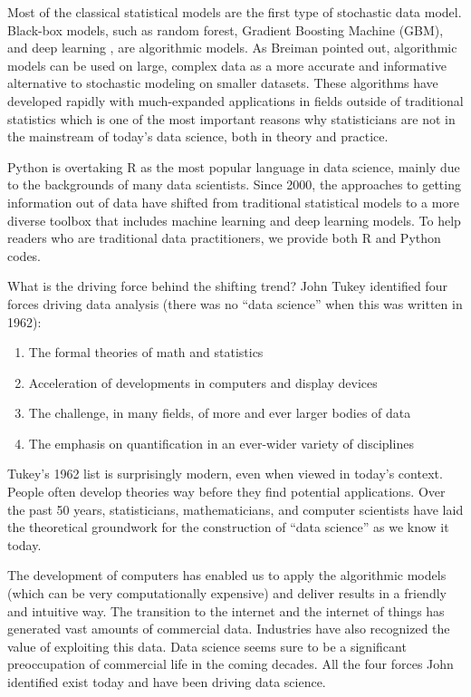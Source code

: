 \documentclass[
  12pt,
]{krantz}
\providecommand{\tightlist}{%
  \setlength{\itemsep}{0pt}\setlength{\parskip}{0pt}}
\begin{document}
Most of the classical statistical models are the first type of stochastic data model. Black-box models, such as random forest, Gradient Boosting Machine (GBM), and deep learning , are algorithmic models. As Breiman pointed out, algorithmic models can be used on large, complex data as a more accurate and informative alternative to stochastic modeling on smaller datasets. These algorithms have developed rapidly with much-expanded applications in fields outside of traditional statistics which is one of the most important reasons why statisticians are not in the mainstream of today's data science, both in theory and practice.

Python is overtaking R as the most popular language in data science, mainly due to the backgrounds of many data scientists. Since 2000, the approaches to getting information out of data have shifted from traditional statistical models to a more diverse toolbox that includes machine learning and deep learning models. To help readers who are traditional data practitioners, we provide both R and Python codes.

What is the driving force behind the shifting trend? John Tukey identified four forces driving data analysis (there was no ``data science'' when this was written in 1962):

\begin{enumerate}
\def\labelenumi{\arabic{enumi}.}
\tightlist
\item
  The formal theories of math and statistics
\item
  Acceleration of developments in computers and display devices
\item
  The challenge, in many fields, of more and ever larger bodies of data
\item
  The emphasis on quantification in an ever-wider variety of disciplines
\end{enumerate}

Tukey's 1962 list is surprisingly modern, even when viewed in today's context. People often develop theories way before they find potential applications. Over the past 50 years, statisticians, mathematicians, and computer scientists have laid the theoretical groundwork for the construction of ``data science'' as we know it today.

The development of computers has enabled us to apply the algorithmic models (which can be very computationally expensive) and deliver results in a friendly and intuitive way. The transition to the internet and the internet of things has generated vast amounts of commercial data. Industries have also recognized the value of exploiting this data. Data science seems sure to be a significant preoccupation of commercial life in the coming decades. All the four forces John identified exist today and have been driving data science.
\end{document}
